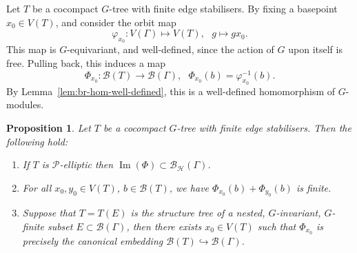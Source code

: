 \documentclass[11pt,a4paper]{amsart}
\newcommand{\into}{\hookrightarrow}
\newtheorem{proposition}[theorem]{Proposition}
\theoremstyle{definition}
\newcommand{\per}{\mathcal{H}}
\newcommand{\br}{{\mathscr{B}}}
\begin{document}
Let $T$ be a cocompact $G$-tree with finite edge stabilisers. By fixing a basepoint $x_0 \in V(T)$, and consider the orbit map 
    $$
    \varphi_{x_0} : V(\Gamma) \mapsto V(T), \ \ \ g  \mapsto g x_0. 
    $$
    This map is $G$-equivariant, and well-defined, since the action of $G$ upon itself is free. Pulling back, this induces a map
    $$
    \Phi_{x_0} : \br(T) \to \br(\Gamma), \ \ \ \Phi_{x_0}(b) = \varphi_{x_0}^{-1}(b).
    $$
    By Lemma~\ref{lem:br-hom-well-defined}, this is a well-defined homomorphism of $G$-modules. 

\begin{proposition}\label{prop:map-from-br-tree-to-br-gamma}
    Let $T$ be a cocompact $G$-tree with finite edge stabilisers. Then the following hold:
    \begin{enumerate}
        \item\label{itm:basic-1} If $T$ is $\mathcal P$-elliptic then $\operatorname{Im}(\Phi) \subset \br_\per(\Gamma)$. 

        \item\label{itm:basic-2} For all $x_0, y_0 \in V(T)$, $b \in \br(T)$, we have $\Phi_{x_0}(b) + \Phi_{y_0}(b)$ is finite.


        \item\label{itm:basic-4} Suppose that $T = T(E)$ is the structure tree of a nested, $G$-invariant, $G$-finite subset $E \subset \br(\Gamma)$, then there exists $x_0 \in V(T)$ such that $\Phi_{x_0}$ is precisely the canonical embedding $\br(T) \into \br(\Gamma)$. 
    \end{enumerate}
    
\end{proposition}
\end{document}
